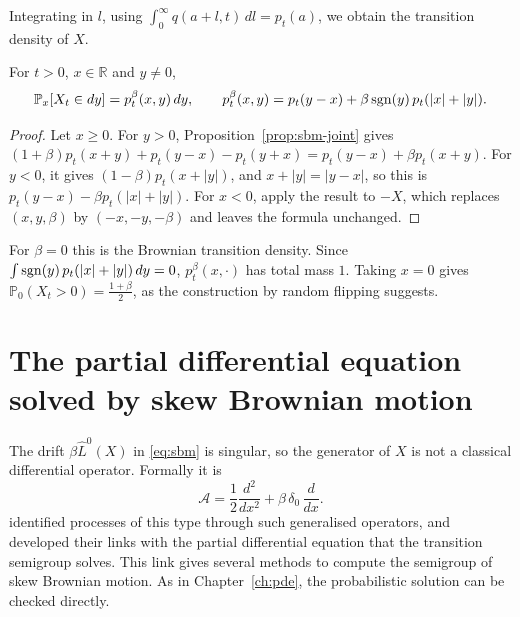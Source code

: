 Integrating in $l$, using $\int_0^\infty q(a+l,t)\,dl = p_t(a)$, we obtain
the transition density of $X$.

\begin{proposition}\label{prop:sbm-density}
	For $t>0$, $x\in\mathbb{R}$ and $y\neq0$,
	\[
		\mathbb{P}_x[X_t\in dy] = p^\beta_t(x,y)\,dy, \qquad
		p^\beta_t(x,y) = p_t(y-x) + \beta\operatorname{sgn}(y)\,p_t(|x|+|y|).
	\]
\end{proposition}
\begin{proof}
	Let $x\geqslant0$. For $y>0$, Proposition~\ref{prop:sbm-joint} gives
	$(1+\beta)p_t(x+y) + p_t(y-x) - p_t(y+x) = p_t(y-x) + \beta p_t(x+y)$. For
	$y<0$, it gives $(1-\beta)p_t(x+|y|)$, and $x+|y| = |y-x|$, so this is
	$p_t(y-x) - \beta p_t(|x|+|y|)$. For $x<0$, apply the result to $-X$, which
	replaces $(x,y,\beta)$ by $(-x,-y,-\beta)$ and leaves the formula unchanged.
\end{proof}

For $\beta = 0$ this is the Brownian transition density. Since
$\int\operatorname{sgn}(y)\,p_t(|x|+|y|)\,dy = 0$, $p^\beta_t(x,\cdot)$ has total mass
$1$. Taking $x = 0$ gives $\mathbb{P}_0(X_t>0) = \frac{1+\beta}{2}$, as the
construction by random flipping suggests.

\section{The partial differential equation solved by skew Brownian motion}\label{sec:sbm-pde}

The drift $\beta\hat{L}^0(X)$ in \eqref{eq:sbm} is singular, so the generator
of $X$ is not a classical differential operator. Formally it is
\[
	\mathcal{A} = \frac{1}{2}\frac{d^2}{dx^2} + \beta\,\delta_0\,\frac{d}{dx}.
\]
\citet{Portenko1990} identified processes of this type through such generalised
operators, and developed their links with the partial differential equation
that the transition semigroup solves. This link gives several methods to
compute the semigroup of skew Brownian motion. As in Chapter~\ref{ch:pde}, the
probabilistic solution can be checked directly.

